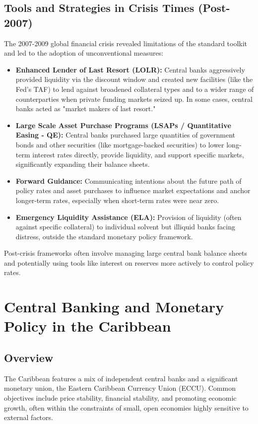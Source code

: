 \subsection{Tools and Strategies in Crisis Times (Post-2007)}
The 2007-2009 global financial crisis revealed limitations of the standard toolkit and led to the adoption of unconventional measures:
\begin{itemize}
    \item \textbf{Enhanced Lender of Last Resort (LOLR):} Central banks aggressively provided liquidity via the discount window and created new facilities (like the Fed's TAF) to lend against broadened collateral types and to a wider range of counterparties when private funding markets seized up. In some cases, central banks acted as "market makers of last resort."
    \item \textbf{Large Scale Asset Purchase Programs (LSAPs / Quantitative Easing - QE):} Central banks purchased large quantities of government bonds and other securities (like mortgage-backed securities) to lower long-term interest rates directly, provide liquidity, and support specific markets, significantly expanding their balance sheets.
    \item \textbf{Forward Guidance:} Communicating intentions about the future path of policy rates and asset purchases to influence market expectations and anchor longer-term rates, especially when short-term rates were near zero.
    \item \textbf{Emergency Liquidity Assistance (ELA):} Provision of liquidity (often against specific collateral) to individual solvent but illiquid banks facing distress, outside the standard monetary policy framework.
\end{itemize}
Post-crisis frameworks often involve managing large central bank balance sheets and potentially using tools like interest on reserves more actively to control policy rates.

\section{Central Banking and Monetary Policy in the Caribbean}

\subsection{Overview}
The Caribbean features a mix of independent central banks and a significant monetary union, the Eastern Caribbean Currency Union (ECCU). Common objectives include price stability, financial stability, and promoting economic growth, often within the constraints of small, open economies highly sensitive to external factors.

